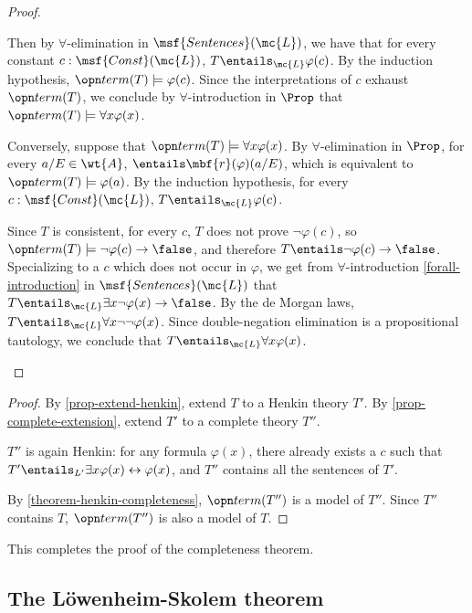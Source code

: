 \documentclass[11pt]{article}
\begin{document}
\begin{proof}
\begin{itemize}
  Then by $\forall$-elimination in $\msf{Sentences}(\mc{L})$, we have that for every constant $c : \msf{Const}(\mc{L})$, $T \entails_{\mc{L}} \varphi(c)$. By the induction hypothesis, $\term(T) \models \varphi(c)$. Since the interpretations of $c$ exhaust $\term(T)$, we conclude by $\forall$-introduction in $\Prop$ that $\term(T) \models \forall x \varphi(x)$.

   Conversely, suppose that $\term(T) \models \forall x \varphi(x)$. By $\forall$-elimination in $\Prop$, for every $a/E \in \wt{A}$, $\entails \mbf{r}(\varphi)(a/E)$, which is equivalent to $\term(T) \models \varphi(a)$. By the induction hypothesis, for every $c : \msf{Const}(\mc{L})$, $T \entails_{\mc{L}} \varphi(c)$.

  Since $T$ is consistent, for every $c$, $T$ does not prove $\neg \varphi(c)$, so $\term(T) \models \neg \varphi(c) \to \false$, and therefore $T \entails \neg \varphi(c) \to \false$. Specializing to a $c$ which does not occur in $\varphi$, we get from $\forall$-introduction \ref{forall-introduction} in $\msf{Sentences}(\mc{L})$ that $T \entails_{\mc{L}} \exists x \neg \varphi(x) \to \false$. By the de Morgan laws, $T \entails_{\mc{L}} \forall x \neg \neg \varphi(x)$. Since double-negation elimination is a propositional tautology, we conclude that $T \entails_{\mc{L}} \forall x \varphi(x)$.
\end{itemize}
\end{proof}


\begin{proof}
  By \ref{prop-extend-henkin}, extend $T$ to a Henkin theory $T'$. By \ref{prop-complete-extension}, extend $T'$ to a complete theory $T''$.

  $T''$ is again Henkin: for any formula $\varphi(x)$, there already exists a $c$ such that $T' \entails_{L'} \exists x \varphi(x) \leftrightarrow \varphi(x)$, and $T''$ contains all the sentences of $T'$.

  By \ref{theorem-henkin-completeness}, $\term(T'')$ is a model of $T''$. Since $T''$ contains $T$, $\term(T'')$ is also a model of $T$.
\end{proof}

This completes the proof of the completeness theorem.

\subsection{The L\"owenheim-Skolem theorem}
\end{document}
